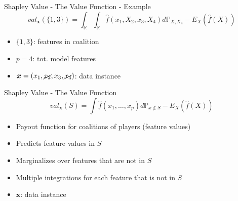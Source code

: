 \begin{frame}{Shapley Value - The Value Function - Example}
	\begin{equation}
		val_{\bm{x}}(\{1,3\})=\int_{\mathbb{R}}\int_{\mathbb{R}}\hat{f}(x_{1},X_{2},x_{3},X_{4})d\mathbb{P}_{X_2X_4}-E_X(\hat{f}(X))
	\end{equation}
	\begin{itemize}
		\item $\{1,3\}$: features in coalition
		\item $p = 4$: tot. model features
		\item $\bm{x} = (x_1, \cancel{x_2}, x_3, \cancel{x_4})$: data instance
	\end{itemize}
\end{frame}

\begin{frame}{Shapley Value - The Value Function}
	\begin{equation}
		val_{\bm{x}}(S)=\int\hat{f}(x_{1},\ldots,x_{p})d\mathbb{P}_{x\notin{}S}-E_X(\hat{f}(X))
	\end{equation}
	\begin{itemize}
		\item Payout function for coalitions of players (feature values)
		\item Predicts feature values in $S$
		\item Marginalizes over features that are not in $S$
		\item Multiple integrations for each feature that is not in $S$
		\item $\bm{x}$: data instance
	\end{itemize}
\end{frame}
